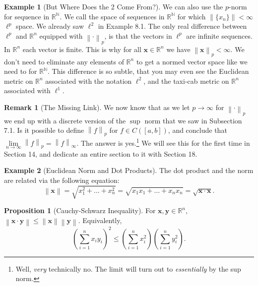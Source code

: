 \documentclass{article}
\newcommand{\N}{\mathbb{N}}
\newcommand{\R}{\mathbb{R}}
\newcommand{\x}{\mathbf{x}}
\newcommand{\y}{\mathbf{y}}
\newcommand{\norm}[1]{\left\lVert#1\right\rVert}
\theoremstyle{definition}
\newtheorem{proposition}{Proposition}[section]
\newtheorem{example}{Example}[section]
\newtheorem{remark}{Remark}[section]
\begin{document}
\begin{example}[But Where Does the 2 Come From?]
		
		We can also use the $ p $-norm for sequence in $ \R^\N $. We call the space of sequences in $ \R^\N $ for which $ \norm{\{x_n\}}<\infty $ $ \ell^p $ space. We already saw $ \ell^2 $ in Example 8.1. The only real difference between $ \ell^p $ and $ \R^n $ equipped with $ \norm{\cdot}_p $, is that the vectors in $ \ell^p $ are infinite sequences. In $ \R^n $ each vector is finite. This is why for all $ \x\in\R^n $ we have $ \norm{\x}_p<\infty $. We don't need to eliminate any elements of $ \R^n $ to get a normed vector space like we need to for $ \R^\N $. This difference is so subtle, that you may even see the Euclidean metric on $ \R^n $ associated with the notation $ \ell^2 $, and the taxi-cab metric on $ \R^n $ associated with $ \ell^1 $.  
	\end{example}
	\begin{remark}[The Missing Link]
		We now know that as we let $ p\to\infty $ for $ \norm{\cdot}_p $ we end up with a discrete version of the $ \sup $ norm that we saw in Subsection 7.1. Is it possible to define $ \norm{f}_p $ for $ f\in C([a,b]) $, and conclude that $ \lim\limits_{n\to\infty}\norm{f}_p=\norm{f}_\infty $. The answer is yes.\footnote{Well, \textit{very} technically no. The limit will turn out to \textit{essentially} by the sup norm.} We will see this for the first time in Section 14, and dedicate an entire section to it with Section 18.
	\end{remark}
	\begin{example}[Euclidean Norm and Dot Products]
		The dot product and the norm are related via the following equation:
		$$ \norm{\x}=\sqrt{x_1^2+\ldots+x_n^2}=\sqrt{x_1x_1+\ldots+x_nx_n}=\sqrt{\x\cdot\x}.$$
	\end{example}
	\begin{proposition}[Cauchy-Schwarz Inequality]
		For $ \x,\y\in\R^n $, $\norm{\x\cdot\y}\le \norm{\x}\norm{\y} $. Equivalently, 
		$$ \left(\sum_{i=1}^{n}x_iy_i\right)^2\le \left(\sum_{i=1}^n x_i^2\right)\left(\sum_{i=1}^n y_i^2\right).$$
	\end{proposition}
\end{document}
